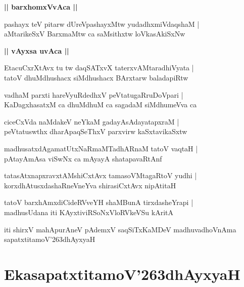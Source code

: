 \documentclass[twoside,12pt,openright]{book}
\def\S{\char'263}
\newcounter{shloka}[chapter]
\def\uvaca#1{\centerline{{\large\textbf{#1}}}}
\begin{document}
\uvaca{|| barxhomxVvAca ||}

\begin{shloka}%
pashayx teV pitarw dUreVpashayxMtw yudadhxmiVdaqshaM |\\
aMtarikeSxV BarxmaMtw ca saMsithxtw loVkasAkiSxNw
\end{shloka}

\uvaca{|| vAyxsa uvAca ||}

\begin{shloka}%
EtacuCxrXtAvx tu tw daqSATxvX taterxvAMtaradhiVyata |\\
tatoV dhuMdhushacx siMdhushacx BArxtarw baladapiRtw
\end{shloka}

\begin{shloka}%
vadhaM parxti hareVyuRdedhxV peVtatugaRruDoVpari |\\
KaDagxhasatxM ca dhuMdhuM ca sagadaM siMdhumeVva ca 
\end{shloka}

\begin{shloka}%
ciceCxVda naMdakeV neYkaM gadayAsAdayatapxraM |\\
peVtatuswthx dharApaqSeThxV parxvirw kaSxtavikaSxtw
\end{shloka}

\begin{shloka}%
madhusatxdAgamatUtxNaRmaMTadhARnaM tatoV vaqtaH |\\
pAtayAmAsa viSwNx ca mAyayA shatapavaRtAnf
\end{shloka}

\begin{shloka}%
tatasAtxnapxravxtAMshiCxtAvx tamasoVMtagaRtoV yudhi |\\
korxdhAtusxdashaRneVneYva shirasiCxtAvx nipAtitaH 
\end{shloka}

\begin{shloka}%
tatoV barxhAmxdiCideRVveYH shaMBunA tirxdasheYrapi |\\
madhusUdana iti KAyxtiviRSoNxVloRVkeVSu kAritA 
\end{shloka}

\begin{center}
iti shirxV mahApurAneV pAdemxV saqSiTxKaMDeV madhuvadhoVnAma sapatxtitamoV\S dhAyxyaH
\end{center}


\chapter{EkasapatxtitamoV\S dhAyxyaH}
\end{document}
